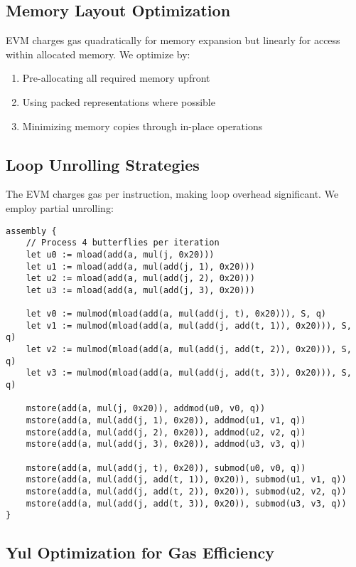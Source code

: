 \documentclass[11pt,a4paper]{article}
\begin{document}
\subsection{Memory Layout Optimization}

EVM charges gas quadratically for memory expansion but linearly for access within allocated memory. We optimize by:

\begin{enumerate}
\item Pre-allocating all required memory upfront
\item Using packed representations where possible
\item Minimizing memory copies through in-place operations
\end{enumerate}

\subsection{Loop Unrolling Strategies}

The EVM charges gas per instruction, making loop overhead significant. We employ partial unrolling:

\begin{lstlisting}[caption={Unrolled Butterfly Operations}]
assembly {
    // Process 4 butterflies per iteration
    let u0 := mload(add(a, mul(j, 0x20)))
    let u1 := mload(add(a, mul(add(j, 1), 0x20)))
    let u2 := mload(add(a, mul(add(j, 2), 0x20)))
    let u3 := mload(add(a, mul(add(j, 3), 0x20)))

    let v0 := mulmod(mload(add(a, mul(add(j, t), 0x20))), S, q)
    let v1 := mulmod(mload(add(a, mul(add(j, add(t, 1)), 0x20))), S, q)
    let v2 := mulmod(mload(add(a, mul(add(j, add(t, 2)), 0x20))), S, q)
    let v3 := mulmod(mload(add(a, mul(add(j, add(t, 3)), 0x20))), S, q)

    mstore(add(a, mul(j, 0x20)), addmod(u0, v0, q))
    mstore(add(a, mul(add(j, 1), 0x20)), addmod(u1, v1, q))
    mstore(add(a, mul(add(j, 2), 0x20)), addmod(u2, v2, q))
    mstore(add(a, mul(add(j, 3), 0x20)), addmod(u3, v3, q))

    mstore(add(a, mul(add(j, t), 0x20)), submod(u0, v0, q))
    mstore(add(a, mul(add(j, add(t, 1)), 0x20)), submod(u1, v1, q))
    mstore(add(a, mul(add(j, add(t, 2)), 0x20)), submod(u2, v2, q))
    mstore(add(a, mul(add(j, add(t, 3)), 0x20)), submod(u3, v3, q))
}
\end{lstlisting}

\subsection{Yul Optimization for Gas Efficiency}
\end{document}
